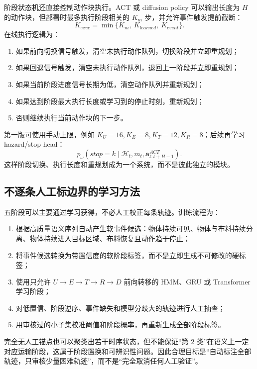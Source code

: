 \documentclass[UTF8,a4paper,11pt]{ctexart}
\begin{document}
阶段状态机还直接控制动作块执行。ACT 或 diffusion policy 可以输出长度为 $H$ 的动作块，但部署时最多执行阶段相关的 $K_m$ 步，并允许事件触发提前截断：
\begin{equation}
K_{exec}=\min\{K_m,\ K_{learned},\ K_{event}\}.
\end{equation}
在线执行逻辑为：
\begin{enumerate}[leftmargin=2.3em]
  \item 如果前向切换信号触发，清空未执行动作队列，切换阶段并立即重规划；
  \item 如果回退信号触发，清空未执行动作队列，退回上一阶段并立即重规划；
  \item 如果当前阶段进度信号长期为低，清空动作队列并重新规划；
  \item 如果达到阶段最大执行长度或学习到的停止时刻，重新规划；
  \item 否则继续执行当前动作块的下一步。
\end{enumerate}
第一版可使用手动上限，例如 $K_U=16,K_E=8,K_T=12,K_R=8$；后续再学习 hazard/stop head：
\begin{equation}
p_{\omega}(stop=k\mid \mathcal H_t,m_t,\bm a_{t:t+H-1}^{ACT}).
\end{equation}
这样阶段切换、执行长度和重规划成为一个系统，而不是彼此独立的模块。

\subsection{不逐条人工标边界的学习方法}

五阶段可以主要通过学习获得，不必人工校正每条轨迹。训练流程为：
\begin{enumerate}[leftmargin=2.3em]
  \item 根据高质量语义序列自动产生软事件候选：物体持续可见、物体与布料持续分离、物体持续进入目标区域、布料恢复且动作趋于停止；
  \item 将事件候选转换为带置信度的软阶段标签，而不是立即生成不可修改的硬标签；
  \item 使用只允许 $U\rightarrow E\rightarrow T\rightarrow R\rightarrow D$ 前向转移的 HMM、GRU 或 Transformer 学习阶段；
  \item 对低置信、阶段逆序、事件缺失和模型分歧大的轨迹进行人工抽查；
  \item 用审核过的小子集校准阈值和阶段概率，再重新生成全部阶段标签。
\end{enumerate}

完全无人工锚点也可以聚类出若干时序状态，但不能保证“第 2 类”在语义上一定对应运输阶段，这属于阶段置换和可辨识性问题。因此合理目标是“自动标注全部轨迹，只审核少量困难轨迹”，而不是“完全取消任何人工验证”。
\end{document}
